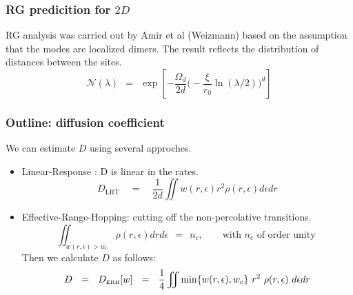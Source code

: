 \documentclass{beamer}
\newcommand{\tbox}[1]{\mbox{\tiny #1}}
\begin{document}
\begin{frame}
\frametitle{RG predicition for $2D$}
RG analysis was carried out by Amir et al (Weizmann) based on the assumption that the modes are localized dimers.
The result reflects the distribution of distances between the sites.
\[ \mathcal{N}(\lambda) \ \ = \ \ \exp\left[ -\frac{\Omega_d}{2d} \Big(-\frac{\xi}{r_0} \ln(\lambda/2)\Big)^d \right]\]
\end{frame}

\begin{frame}
\frametitle{Outline: diffusion coefficient}
We can estimate $D$ using several approches.
\begin{itemize}
\item Linear-Response : D is linear in the rates.
  \[D_{\textrm{LRT}} \quad = \quad \frac{1}{2d}\iint w(r,\epsilon)r^2\rho(r,\epsilon)d\epsilon dr\]
\item Effective-Range-Hopping: cutting off the non-percolative transitions.
%
\[
\iint_{w(r,\epsilon)>w_c} \rho(r,\epsilon)drd\epsilon \ \ = \ \ n_c, 
\ \ \ \ \ \ \ \ \ \mbox{with $n_c$ of order unity }
\]
%
Then we calculate $D$ as follows:
%
\[
D \ \ = \ \ D_{\tbox{ERH}}[{w}]  \ \ = \ \ \frac{1}{4}\iint \min\{w(r,\epsilon),w_c\} \ r^2  \ \rho(r,\epsilon) \ d\epsilon dr
\]
%
\end{itemize}

\end{frame}
\end{document}
